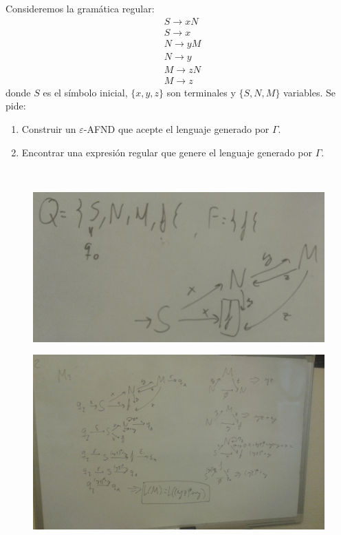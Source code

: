 \documentclass[twoside]{article}
\begin{document}
\begin{ejercicio}{13}
Consideremos la gramática regular:
\begin{align*}
&S \rightarrow xN\\
&S \rightarrow x\\
&N \rightarrow yM\\
&N \rightarrow y\\
&M \rightarrow zN\\
&M \rightarrow z
\end{align*}
donde $S$ es el símbolo inicial, $\{x, y, z\}$ son terminales y $\{S,N,M\}$ variables. Se pide:
\begin{enumerate}
\item Construir un $\varepsilon$-AFND que acepte el lenguaje generado por $\Gamma$.
\item Encontrar una expresión regular que genere el lenguaje generado por $\Gamma$.
\end{enumerate}
\end{ejercicio}
\begin{solucion}\

\begin{figure}[h!]
\includegraphics[scale=0.1]{Automatas/13-1}
\end{figure}
\begin{figure}[h!]
\includegraphics[scale=0.12]{Automatas/13-2}
\end{figure}\
\end{solucion}
\end{document}
